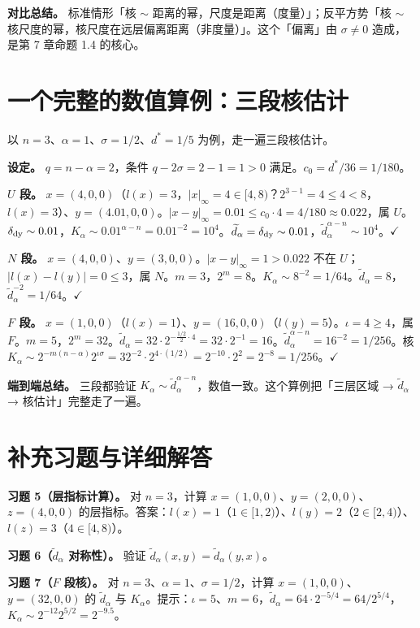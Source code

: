 \documentclass[a4paper,11pt,openany]{ctexbook}
\numberwithin{equation}{chapter}
\numberwithin{figure}{chapter}
\numberwithin{table}{chapter}
\begin{document}
\textbf{对比总结。} 标准情形「核 $\sim$ 距离的幂，尺度是距离（度量）」；反平方势「核 $\sim$ 核尺度的幂，核尺度在远层偏离距离（非度量）」。这个「偏离」由 $\sigma\neq0$ 造成，是第 7 章命题 1.4 的核心。

\section{一个完整的数值算例：三段核估计}

以 $n=3$、$\alpha=1$、$\sigma=1/2$、$d^*=1/5$ 为例，走一遍三段核估计。

\textbf{设定。} $q=n-\alpha=2$，条件 $q-2\sigma=2-1=1>0$ 满足。$c_0=d^*/36=1/180$。

\textbf{$U$ 段。} $x=(4,0,0)$（$l(x)=3$，$|x|_\infty=4\in[4,8)$？$2^{3-1}=4\le4<8$，$l(x)=3$）、$y=(4.01,0,0)$。$|x-y|_\infty=0.01\le c_0\cdot4=4/180\approx0.022$，属 $U$。$\delta_{\rm dy}\sim0.01$，$K_\alpha\sim0.01^{\alpha-n}=0.01^{-2}=10^4$。$\widetilde d_\alpha=\delta_{\rm dy}\sim0.01$，$\widetilde d_\alpha^{\alpha-n}\sim10^4$。$\checkmark$

\textbf{$N$ 段。} $x=(4,0,0)$、$y=(3,0,0)$。$|x-y|_\infty=1>0.022$ 不在 $U$；$|l(x)-l(y)|=0\le3$，属 $N$。$m=3$，$2^m=8$。$K_\alpha\sim8^{-2}=1/64$。$\widetilde d_\alpha=8$，$\widetilde d_\alpha^{-2}=1/64$。$\checkmark$

\textbf{$F$ 段。} $x=(1,0,0)$（$l(x)=1$）、$y=(16,0,0)$（$l(y)=5$）。$\iota=4\ge4$，属 $F$。$m=5$，$2^m=32$。$\widetilde d_\alpha=32\cdot2^{-\frac{1/2}{2}\cdot4}=32\cdot2^{-1}=16$。$\widetilde d_\alpha^{\alpha-n}=16^{-2}=1/256$。核 $K_\alpha\sim2^{-m(n-\alpha)}2^{\iota\sigma}=32^{-2}\cdot2^{4\cdot(1/2)}=2^{-10}\cdot2^2=2^{-8}=1/256$。$\checkmark$

\textbf{端到端总结。} 三段都验证 $K_\alpha\sim\widetilde d_\alpha^{\alpha-n}$，数值一致。这个算例把「三层区域 → $\widetilde d_\alpha$ → 核估计」完整走了一遍。

\section{补充习题与详细解答}

\textbf{习题 5（层指标计算）。} 对 $n=3$，计算 $x=(1,0,0)$、$y=(2,0,0)$、$z=(4,0,0)$ 的层指标。答案：$l(x)=1$（$1\in[1,2)$）、$l(y)=2$（$2\in[2,4)$）、$l(z)=3$（$4\in[4,8)$）。

\textbf{习题 6（$\widetilde d_\alpha$ 对称性）。} 验证 $\widetilde d_\alpha(x,y)=\widetilde d_\alpha(y,x)$。

\textbf{习题 7（$F$ 段核）。} 对 $n=3$、$\alpha=1$、$\sigma=1/2$，计算 $x=(1,0,0)$、$y=(32,0,0)$ 的 $\widetilde d_\alpha$ 与 $K_\alpha$。提示：$\iota=5$、$m=6$，$\widetilde d_\alpha=64\cdot2^{-5/4}=64/2^{5/4}$，$K_\alpha\sim2^{-12}2^{5/2}=2^{-9.5}$。
\end{document}

